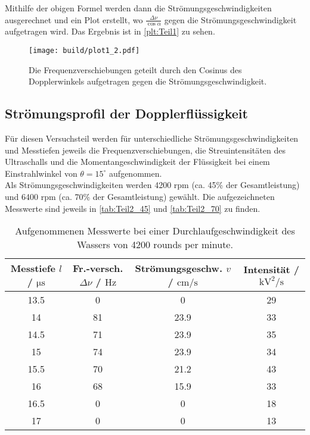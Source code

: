 Mithilfe der obigen Formel werden dann die Strömungsgeschwindigkeiten ausgerechnet und ein Plot erstellt,
wo $\frac{\Delta \nu}{\cos{\alpha}}$ gegen die Strömungsgeschwindigkeit aufgetragen wird. Das Ergebnis ist in 
\autoref{plt:Teil1} zu sehen.

\begin{figure}
  \centering
  \texttt{[image: build/plot1\_2.pdf]}
  \caption{Die Frequenzverschiebungen geteilt durch den Cosinus des Dopplerwinkels aufgetragen gegen 
  die Strömungsgeschwindigkeit.}
  \label{plt:Teil1}
\end{figure}


\subsection{Strömungsprofil der Dopplerflüssigkeit}

Für diesen Versuchsteil werden für unterschiedliche Strömungsgeschwindigkeiten und Messtiefen jeweils die
Frequenzverschiebungen, die Streuintensitäten des Ultraschalls und die Momentangeschwindigkeit der Flüssigkeit
bei einem Einstrahlwinkel von $\theta = 15^{\circ}$ aufgenommen.\\
Als Strömungsgeschwindigkeiten werden 4200 rpm (ca. 45\% der Gesamtleistung) und 6400 rpm (ca. 70\% der
Gesamtleistung) gewählt. Die aufgezeichneten Messwerte sind jeweils in \autoref{tab:Teil2_45} und 
\autoref{tab:Teil2_70} zu finden.\\

\begin{table}
  \centering
  \begin{tabular}{c | c | c | c}
    \toprule
    Messtiefe $l$ / $\si{\micro\second}$ & Fr.-versch. $\Delta \nu$ / $\si{\hertz}$ & Strömungsgeschw. $v$ / $\si{\centi\meter\per\second}$ & Intensität / $\si{\kilo\volt\squared\per\second}$ \\
    \midrule
    13.5        &    0      &     0         &      29\\
    14          &    81     &     23.9      &      33\\
    14.5        &    71     &     23.9      &      35\\
    15          &    74     &     23.9      &      34\\
    15.5        &    70     &     21.2      &      43\\
    16          &    68     &     15.9      &      33\\
    16.5        &    0      &     0         &      18\\
    17          &    0      &     0         &      13\\
    \bottomrule
  \end{tabular}
  \caption{Aufgenommenen Messwerte bei einer Durchlaufgeschwindigkeit des Wassers von 4200 rounds per minute.}
  \label{tab:Teil2_45}
\end{table}

